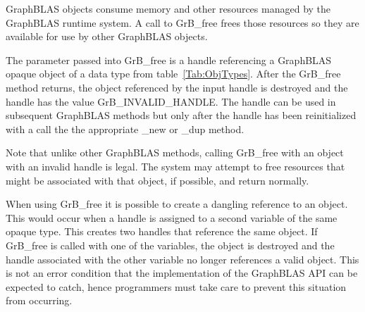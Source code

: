 GraphBLAS objects consume memory and other resources
managed by the GraphBLAS runtime system. A call to {\sf GrB\_free}
frees those resources so they are available for use by other GraphBLAS objects.

The parameter passed into {\sf GrB\_free} is a handle referencing a GraphBLAS 
opaque object of a data type from table~\ref{Tab:ObjTypes}.    After the {\sf GrB\_free} 
method returns, the object referenced by the input handle is destroyed 
and the handle has the value {\sf GrB\_INVALID\_HANDLE}.
The handle can be used in subsequent GraphBLAS methods but only after the handle
has been reinitialized with a call the the appropriate {\sf \_new} or {\sf \_dup} method.

Note that unlike other GraphBLAS methods, calling {\sf GrB\_free} with an object with 
an invalid handle is legal.  The system may attempt to free resources that might be associated
with that object, if possible, and return normally.

When using {\sf GrB\_free} it is possible to create a dangling reference to an object.  This would occur
when a handle is assigned to a second variable of the same opaque type.  This creates two handles that reference
the same object. If {\sf GrB\_free} is called with one of the variables, the object is destroyed
and the handle associated with the other variable no longer references a valid object.  This is not
an error condition that the implementation of the GraphBLAS API can be expected to catch, hence
programmers must take care to prevent this situation from occurring.  



